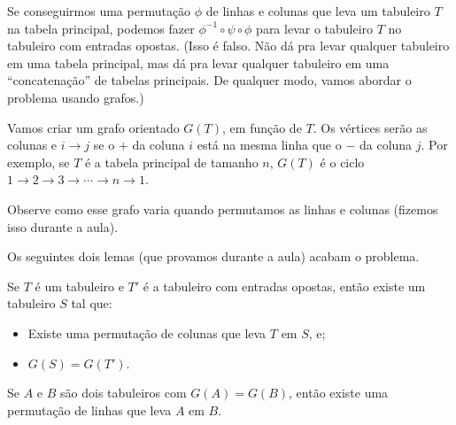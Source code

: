 \documentclass[11pt, a4paper]{article}
\begin{document}
	Se conseguirmos uma permutação $\phi$ de linhas e colunas que leva um tabuleiro $T$ na tabela principal, podemos fazer $\phi^{-1} \circ \psi \circ \phi$ para levar o tabuleiro $T$ no tabuleiro com entradas opostas. (Isso é falso. Não dá pra levar qualquer tabuleiro em uma tabela principal, mas dá pra levar qualquer tabuleiro em uma ``concatenação'' de tabelas principais. De qualquer modo, vamos abordar o problema usando grafos.)
	
	\vspace{2em}

	Vamos criar um grafo orientado $G(T)$, em função de $T$. Os vértices serão as colunas e $i \to j$ se o $+$ da coluna $i$ está na mesma linha que o $-$ da coluna $j$. Por exemplo, se $T$ é a tabela principal de tamanho $n$, $G(T)$ é o ciclo $1 \to 2 \to 3 \to \cdots \to n \to 1$.

	Observe como esse grafo varia quando permutamos as linhas e colunas (fizemos isso durante a aula).

	Os seguintes dois lemas (que provamos durante a aula) acabam o problema.
	\begin{lem}
		Se $T$ é um tabuleiro e $T'$ é a tabuleiro com entradas opostas, então existe um tabuleiro $S$ tal que:
		\begin{itemize}
			\item Existe uma permutação de colunas que leva $T$ em $S$, e;
			\item $G(S) = G(T')$.
		\end{itemize}
	\end{lem}
	\begin{lem}
		Se $A$ e $B$ são dois tabuleiros com $G(A) = G(B)$, então existe uma permutação de linhas que leva $A$ em $B$.
	\end{lem}
	

		
\end{document}
